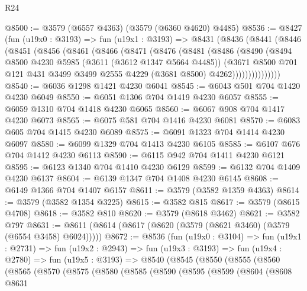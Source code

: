 \begin{lexlean}{R24}
\begin{coremodule}
@8500 := @3579 (@6557 @4363) (@3579 (@6360 @4620) @4485)
@8536 := @8427
    (fun (u19x0 : @3193) =>
    fun (u19x1 : @3193) =>
    @8431
      (@8436
        (@8441
          (@8446
            (@8451
              (@8456
                (@8461
                  (@8466
                    (@8471
                      (@8476
                        (@8481
                          (@8486
                            (@8490
                              (@8494
                                @8500
                                @4230
                                @5985
                                (@3611 (@3612 @1347 @5664 @4485))
                                (@3671
                                  @8500
                                  @701
                                  @121
                                  @431
                                  @3499
                                  @3499
                                  @2555
                                  @4229
                                  (@3681 @8500)
                                  @4262)))))))))))))))
@8540 := @6036 @1298 @1421 @4230 @6041
@8545 := @6043 @501 @704 @1420 @4230 @6049
@8550 := @6051 @1306 @704 @1419 @4230 @6057
@8555 := @6059 @1310 @704 @1418 @4230 @6065
@8560 := @6067 @908 @704 @1417 @4230 @6073
@8565 := @6075 @581 @704 @1416 @4230 @6081
@8570 := @6083 @605 @704 @1415 @4230 @6089
@8575 := @6091 @1323 @704 @1414 @4230 @6097
@8580 := @6099 @1329 @704 @1413 @4230 @6105
@8585 := @6107 @676 @704 @1412 @4230 @6113
@8590 := @6115 @942 @704 @1411 @4230 @6121
@8595 := @6123 @1340 @704 @1410 @4230 @6129
@8599 := @6132 @704 @1409 @4230 @6137
@8604 := @6139 @1347 @704 @1408 @4230 @6145
@8608 := @6149 @1366 @704 @1407 @6157
@8611 := @3579 (@3582 @1359 @4363)
@8614 := @3579 (@3582 @1354 @3225)
@8615 := @3582 @815
@8617 := @3579 (@8615 @4708)
@8618 := @3582 @810
@8620 := @3579 (@8618 @3462)
@8621 := @3582 @797
@8631 := @8611 (@8614 (@8617 (@8620 (@3579 (@8621 @3460) (@3579 (@6554 @3458) @6024)))))
@8672 := @8536
    (fun (u19x0 : @3104) =>
    fun (u19x1 : @2731) =>
    fun (u19x2 : @2943) =>
    fun (u19x3 : @3193) =>
    fun (u19x4 : @2780) =>
    fun (u19x5 : @3193) =>
    @8540
      (@8545
        (@8550
          (@8555
            (@8560
              (@8565
                (@8570
                  (@8575
                    (@8580
                      (@8585
                        (@8590
                          (@8595
                            (@8599
                              (@8604
                                (@8608
                                  @8631

\end{coremodule}
\end{lexlean}
